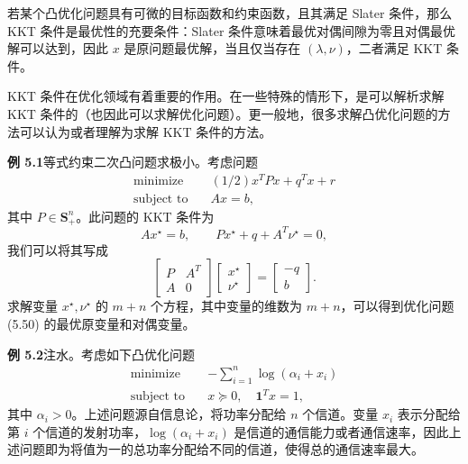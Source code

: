 \documentclass[UTF8,12pt,a4paper,fontset=fandol]{ctexart}
\begin{document}
若某个凸优化问题具有可微的目标函数和约束函数，且其满足 Slater 条件，那么 KKT 条件是最优性的充要条件：Slater 条件意味着最优对偶间隙为零且对偶最优解可以达到，因此 $x$ 是原问题最优解，当且仅当存在 $(\lambda,\nu)$，二者满足 KKT 条件。

KKT 条件在优化领域有着重要的作用。在一些特殊的情形下，是可以解析求解 KKT 条件的（也因此可以求解优化问题）。更一般地，很多求解凸优化问题的方法可以认为或者理解为求解 KKT 条件的方法。

\noindent\textbf{例 5.1}\quad 等式约束二次凸问题求极小。考虑问题
\begin{equation}
\begin{aligned}
\text{minimize}\quad & (1/2)x^TPx+q^Tx+r\\
\text{subject to}\quad & Ax=b,
\end{aligned}
\tag{5.50}
\end{equation}
其中 $P\in\mathbf{S}_+^n$。此问题的 KKT 条件为
\[
Ax^\star=b,\qquad Px^\star+q+A^T\nu^\star=0,
\]
我们可以将其写成
\[
\begin{bmatrix}
P & A^T\\
A & 0
\end{bmatrix}
\begin{bmatrix}
x^\star\\
\nu^\star
\end{bmatrix}
=
\begin{bmatrix}
-q\\
b
\end{bmatrix}.
\]
求解变量 $x^\star,\nu^\star$ 的 $m+n$ 个方程，其中变量的维数为 $m+n$，可以得到优化问题 (5.50) 的最优原变量和对偶变量。

\noindent\textbf{例 5.2}\quad 注水。考虑如下凸优化问题
\[
\begin{aligned}
\text{minimize}\quad & -\sum_{i=1}^n\log(\alpha_i+x_i)\\
\text{subject to}\quad & x\succeq 0,\quad \mathbf{1}^Tx=1,
\end{aligned}
\]
其中 $\alpha_i>0$。上述问题源自信息论，将功率分配给 $n$ 个信道。变量 $x_i$ 表示分配给第 $i$ 个信道的发射功率，$\log(\alpha_i+x_i)$ 是信道的通信能力或者通信速率，因此上述问题即为将值为一的总功率分配给不同的信道，使得总的通信速率最大。
\end{document}

